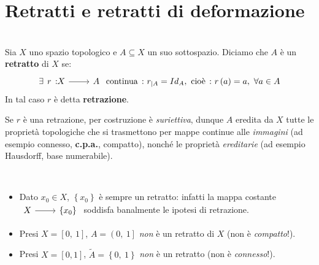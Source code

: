 \section{Retratti e retratti di deformazione}
\begin{define}[Retratto.]~{}\\
	Sia $X$ uno spazio topologico e $A\subseteq X$ un suo sottospazio. Diciamo che $A$ è un \textbf{retratto} di $X$ se:
	\begin{equation}
		\exists \funz{r}{X}{A}\text{ continua}\ \colon r_{\mid A}=Id_A,\ \text{cioè}\ \colon r\left(a\right)=a,\ \forall a\in A
	\end{equation}
In tal caso $r$ è detta \textbf{retrazione}.
\end{define}
\begin{observe}
Se $r$ è una retrazione, per costruzione è \textit{suriettiva}, dunque $A$ eredita da $X$ tutte le proprietà topologiche che si trasmettono per mappe continue alle \textit{immagini} (ad esempio connesso, \textbf{c.p.a.}, compatto), nonché le proprietà \textit{ereditarie} (ad esempio Hausdorff, base numerabile).
\end{observe}
\begin{examples}~{}
	\begin{itemize}
		\item Dato $x_0\in X$, $\left\{x_0\right\}$ è sempre un retratto: infatti la mappa costante $\funz{\ }{X}{\left\{x_0\right\}}$ soddisfa banalmente le ipotesi di retrazione.
		\item Presi $X=\left[0,\ 1\right]$, $A=\left(0,\ 1\right]$ \textit{non} è un retratto di $X$ (non è \textit{compatto}!).
		\item Presi $X=\left[0, 1\right]$, $\widetilde{A}=\left\{0,\ 1\right\}$ \textit{non} è un retratto (non è \textit{connesso}!).
	\end{itemize}
\vspace{-3mm}
\end{examples}
